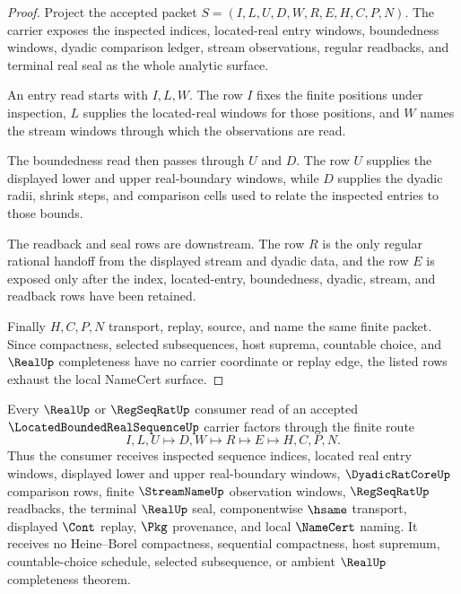 \begin{proof}
Project the accepted packet $S=(I,L,U,D,W,R,E,H,C,P,N)$. The carrier exposes the inspected indices, located-real entry windows, boundedness windows, dyadic comparison ledger, stream observations, regular readbacks, and terminal real seal as the whole analytic surface.

An entry read starts with $I,L,W$. The row $I$ fixes the finite positions under inspection, $L$ supplies the located-real windows for those positions, and $W$ names the stream windows through which the observations are read.

The boundedness read then passes through $U$ and $D$. The row $U$ supplies the displayed lower and upper real-boundary windows, while $D$ supplies the dyadic radii, shrink steps, and comparison cells used to relate the inspected entries to those bounds.

The readback and seal rows are downstream. The row $R$ is the only regular rational handoff from the displayed stream and dyadic data, and the row $E$ is exposed only after the index, located-entry, boundedness, dyadic, stream, and readback rows have been retained.

Finally $H,C,P,N$ transport, replay, source, and name the same finite packet. Since compactness, selected subsequences, host suprema, countable choice, and $\RealUp$ completeness have no carrier coordinate or replay edge, the listed rows exhaust the local NameCert surface.
\end{proof}

\begin{theorem}
\label{thm:located-bounded-real-sequence-real-seal-handoff}
Every $\RealUp$ or $\RegSeqRatUp$ consumer read of an accepted $\LocatedBoundedRealSequenceUp$ carrier factors through the finite route
$$
I,L,U \longmapsto D,W \longmapsto R \longmapsto E \longmapsto H,C,P,N .
$$
Thus the consumer receives inspected sequence indices, located real entry windows, displayed lower and upper real-boundary windows, $\DyadicRatCoreUp$ comparison rows, finite $\StreamNameUp$ observation windows, $\RegSeqRatUp$ readbacks, the terminal $\RealUp$ seal, componentwise $\hsame$ transport, displayed $\Cont$ replay, $\Pkg$ provenance, and local $\NameCert$ naming. It receives no Heine--Borel compactness, sequential compactness, host supremum, countable-choice schedule, selected subsequence, or ambient $\RealUp$ completeness theorem.
\end{theorem}


